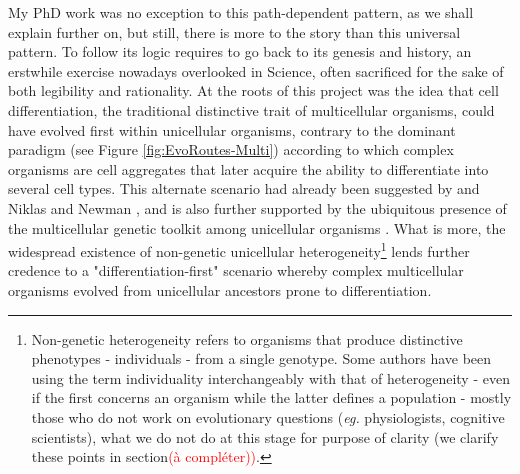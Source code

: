 My PhD work was no exception to this path-dependent pattern, as we shall explain further on, but still, there is more to the story than this universal pattern. To follow its logic requires to go back to its genesis and history, an erstwhile exercise nowadays overlooked in Science, often sacrificed for the sake of both legibility and rationality. At the roots of this project was the idea that cell differentiation, the traditional distinctive trait of multicellular organisms, could have evolved first within unicellular organisms, contrary to the dominant paradigm (see Figure \ref{fig:EvoRoutes-Multi}) according to which complex organisms are cell aggregates that later acquire the ability to differentiate into several cell types. This alternate scenario had already been suggested by \citet{Ispolatov12} and Niklas and Newman \citep{NiklasNewman13,Niklas14}, and is also further supported by the ubiquitous presence of the multicellular genetic toolkit among unicellular organisms \citep{Rokas08,Ruiz-Trillo08,Tikhonenkov20}. What is more, the widespread existence of non-genetic unicellular heterogeneity\footnote{Non-genetic heterogeneity refers to organisms that produce distinctive phenotypes - individuals - from a single genotype. Some authors have been using the term individuality interchangeably with that of heterogeneity \citep{Pradeu16} - even if the first concerns an organism while the latter defines a population - mostly those who do not work on evolutionary questions (\textit{eg.} physiologists, cognitive scientists), what we do not do at this stage for purpose of clarity (we clarify these points in section\textcolor{red}{(à compléter))}.} \citep{Veening08b,Ratcliff10,PaulssonHuh11a,Cerulus16,Takhaveev18} lends further credence to a "differentiation-first" scenario whereby complex multicellular organisms evolved from unicellular ancestors prone to differentiation.

